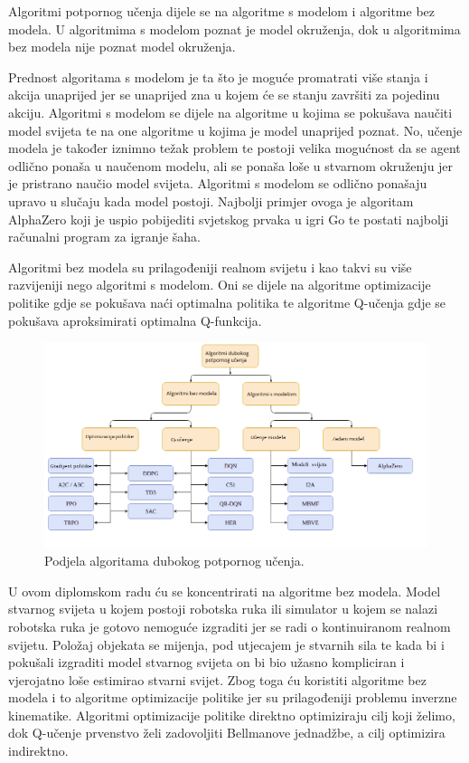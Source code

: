 \documentclass[times,utf8,diplomski]{fer}
\begin{document}
Algoritmi potpornog učenja dijele se na algoritme s modelom i algoritme bez modela. U algoritmima s modelom poznat je model okruženja, dok u algoritmima bez modela nije poznat model okruženja.

Prednost algoritama s modelom je ta što je moguće promatrati više stanja i akcija unaprijed jer se unaprijed zna u kojem će se stanju završiti za pojedinu akciju. Algoritmi s modelom se dijele na algoritme u kojima se pokušava naučiti model svijeta te na one algoritme u kojima je model unaprijed poznat. No, učenje modela je također iznimno težak problem te postoji velika mogućnost da se agent odlično ponaša u naučenom modelu, ali se ponaša loše u stvarnom okruženju jer je pristrano naučio model svijeta. Algoritmi s modelom se odlično ponašaju upravo u slučaju kada model postoji. Najbolji primjer ovoga je algoritam AlphaZero \citep{alphazero} koji je uspio pobijediti svjetskog prvaka u igri Go te postati najbolji računalni program za igranje šaha.

Algoritmi bez modela su prilagođeniji realnom svijetu i kao takvi su više razvijeniji nego algoritmi s modelom. Oni se dijele na algoritme optimizacije politike gdje se pokušava naći optimalna politika te algoritme Q-učenja gdje se pokušava aproksimirati optimalna Q-funkcija.

\begin{figure}[ht!]
	\centering
	\includegraphics[width=\columnwidth]{img/podjela.png}
	\caption{Podjela algoritama dubokog potpornog učenja.\protect\footnotemark}
	\label{fig:atari}
\end{figure}

U ovom diplomskom radu ću se koncentrirati na algoritme bez modela. Model stvarnog svijeta u kojem postoji robotska ruka ili simulator u kojem se nalazi robotska ruka je gotovo nemoguće izgraditi jer se radi o kontinuiranom realnom svijetu. Položaj objekata se mijenja, pod utjecajem je stvarnih sila te kada bi i pokušali izgraditi model stvarnog svijeta on bi bio užasno kompliciran i vjerojatno loše estimirao stvarni svijet. Zbog toga ću koristiti algoritme bez modela i to algoritme optimizacije politike jer su prilagođeniji problemu inverzne kinematike. Algoritmi optimizacije politike direktno optimiziraju cilj koji želimo, dok Q-učenje prvenstvo želi zadovoljiti Bellmanove jednadžbe, a cilj optimizira indirektno.
\end{document}
